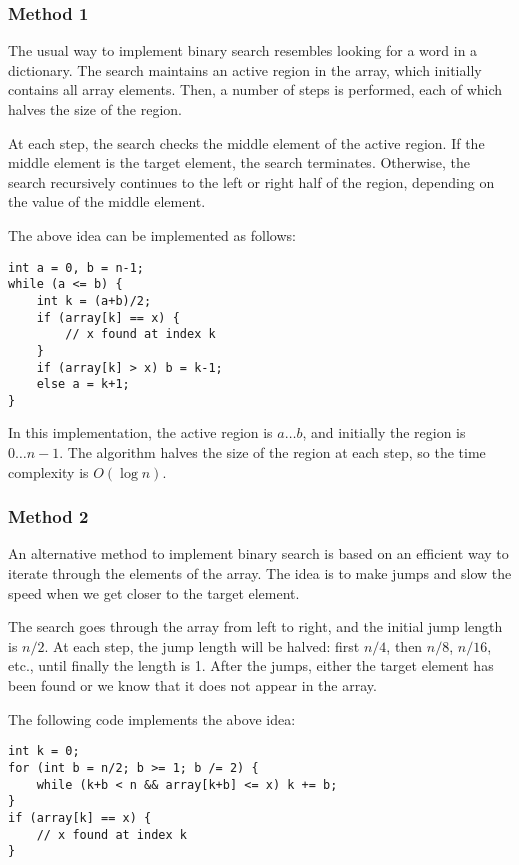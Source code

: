 \subsubsection{Method 1}

The usual way to implement binary search
resembles looking for a word in a dictionary.
The search maintains an active region in the array,
which initially contains all array elements.
Then, a number of steps is performed,
each of which halves the size of the region.

At each step, the search checks the middle element
of the active region.
If the middle element is the target element,
the search terminates.
Otherwise, the search recursively continues
to the left or right half of the region,
depending on the value of the middle element.

The above idea can be implemented as follows:
\begin{lstlisting}
int a = 0, b = n-1;
while (a <= b) {
    int k = (a+b)/2;
    if (array[k] == x) {
        // x found at index k
    }
    if (array[k] > x) b = k-1;
    else a = k+1;
}
\end{lstlisting}

In this implementation, the active region is $a \ldots b$,
and initially the region is $0 \ldots n-1$.
The algorithm halves the size of the region at each step,
so the time complexity is $O(\log n)$.

\subsubsection{Method 2}

An alternative method to implement binary search
is based on an efficient way to iterate through
the elements of the array.
The idea is to make jumps and slow the speed
when we get closer to the target element.

The search goes through the array from left to
right, and the initial jump length is $n/2$.
At each step, the jump length will be halved:
first $n/4$, then $n/8$, $n/16$, etc., until
finally the length is 1.
After the jumps, either the target element has
been found or we know that it does not appear in the array.

The following code implements the above idea:
\begin{lstlisting}
int k = 0;
for (int b = n/2; b >= 1; b /= 2) {
    while (k+b < n && array[k+b] <= x) k += b;
}
if (array[k] == x) {
    // x found at index k
}
\end{lstlisting}

